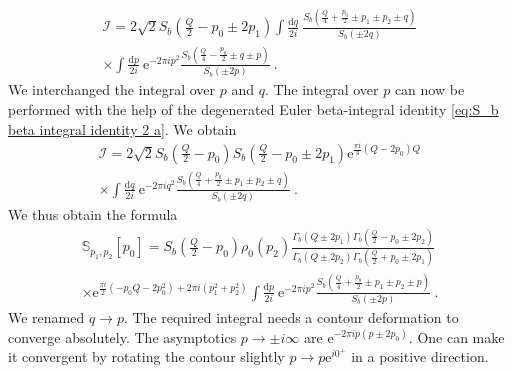 \documentclass[12pt,a4paper]{article}
\renewcommand\d{\text{d}}
\begin{document}
\begin{multline}
    \mathcal{I}=2\sqrt{2} S_b(\tfrac{Q}{2}-p_0 \pm 2p_1)\int\frac{\d q}{2i} \ \frac{S_b(\frac{Q}{4}+\frac{p_0}{2} \pm p_1 \pm p_2 \pm q)}{S_b(\pm 2q)}\\
    \times \int \frac{\d p}{2i} \ \mathrm{e}^{-2\pi i p^2} \frac{S_b(\frac{Q}{4}-\frac{p_0}{2} \pm q \pm p)}{S_b(\pm 2p)}\ .
\end{multline}
We interchanged the integral over $p$ and $q$. The integral over $p$ can now be performed with the help of the degenerated Euler beta-integral identity \eqref{eq:S_b beta integral identity 2 a}. We obtain
\begin{multline}
    \mathcal{I}=2\sqrt{2} S_b(\tfrac{Q}{2}-p_0)S_b(\tfrac{Q}{2}-p_0 \pm 2p_1) \mathrm{e}^{\frac{\pi i}{4}(Q-2p_0)Q} \\
    \times \int \frac{\d q}{2i}\ \mathrm{e}^{-2\pi i q^2} \frac{S_b(\frac{Q}{4}+\frac{p_0}{2} \pm p_1 \pm p_2 \pm q)}{S_b(\pm 2q)}\ . 
\end{multline}
We thus obtain the formula
\begin{multline}
    \mathbb{S}_{p_1,p_2}[p_0]=S_b(\tfrac{Q}{2}-p_0) \rho_0(p_2) \frac{\Gamma_b(Q \pm 2 p_1) \Gamma_b(\frac{Q}{2}-p_0 \pm 2p_2)}{\Gamma_b(Q \pm 2 p_2) \Gamma_b(\frac{Q}{2}+ p_0 \pm 2 p_1)}\\
    \times \mathrm{e}^{\frac{\pi i}{2}(-p_0 Q-2p_0^2)+2\pi i(p_1^2+p_2^2)} \int \frac{\d p}{2i}\ \mathrm{e}^{-2\pi i p^2} \frac{S_b(\frac{Q}{4}+\frac{p_0}{2} \pm p_1 \pm p_2 \pm p)}{S_b(\pm 2p)}\ . \label{eq:modular crossing kernel first form}
\end{multline}
We renamed $q \to p$. The required integral needs a contour deformation to converge absolutely. The asymptotics $p \to \pm i \infty$ are $\mathrm{e}^{-2\pi i p(p \pm 2p_0)}$. One can make it convergent by rotating the contour slightly $p \to p \mathrm{e}^{i 0^+}$ in a positive direction.
\end{document}
